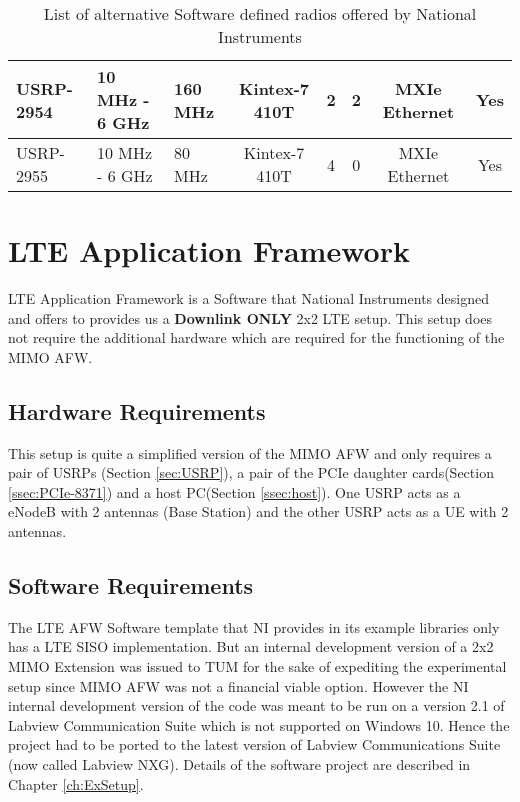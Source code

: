 \begin{landscape}
\begin{table}[htb]
\begin{center}
\begin{tabular}{|l|l|l|c|c|c|c|c|}
                USRP-2954      & 10 \si{\mega\hertz} - 6 \si{\giga\hertz}              & 160 \si{\mega\hertz}                               & Kintex-7 410T & 2               & 2                & MXIe Ethernet          & Yes                    \\ \hline
                USRP-2955      & 10 \si{\mega\hertz} - 6 \si{\giga\hertz}              & 80 \si{\mega\hertz}                                & Kintex-7 410T & 4               & 0                & MXIe Ethernet          & Yes                    \\ \hline
                \end{tabular}
            \end{center}
            \caption{List of alternative Software defined radios offered by National Instruments}
            \label{tb:USRPPartsList}
        \end{table}
\end{landscape}

\section{LTE Application Framework}\label{sec:LTEAFW}

        LTE Application Framework is a Software that National Instruments designed and offers to provides us a \textbf{Downlink ONLY} 2x2 LTE setup. This setup does not require the additional hardware which are required for the functioning of the MIMO AFW.

        \subsection{Hardware Requirements}\label{ssec:LTEAFWHW}
        This setup is quite a simplified version of the MIMO AFW and only requires a pair of USRPs (Section \ref{sec:USRP}), a pair of the PCIe daughter cards(Section \ref{ssec:PCIe-8371}) and a host PC(Section \ref{ssec:host}). One USRP acts as a eNodeB with 2 antennas (Base Station) and the other USRP acts as a UE with 2 antennas.

        \subsection{Software Requirements}\label{ssec:LTEAFWSW}
        The LTE AFW Software template that NI provides in its example libraries only has a LTE SISO implementation. But an internal development version of a 2x2 MIMO Extension was issued to TUM for the sake of expediting the experimental setup since MIMO AFW was not a financial viable option. However the NI internal development version of the code was meant to be run on a version 2.1 of Labview Communication Suite which is not supported on Windows 10. Hence the project had to be ported to the latest version of Labview Communications Suite (now called Labview NXG). Details of the software project are described in Chapter \ref{ch:ExSetup}.

